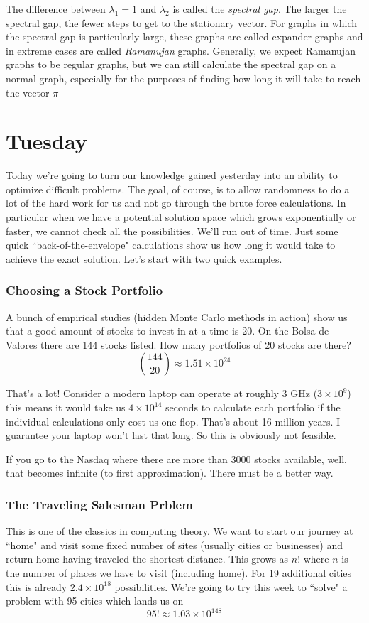 \documentclass{article}
\theoremstyle{definition}
\theoremstyle{remark}
\begin{document}
The difference between $\lambda_1 = 1$ and $\lambda_2$ is called the \emph{spectral gap}. The larger the spectral gap, the fewer steps to get to the stationary vector.  For graphs in which the spectral gap is particularly large, these graphs are called expander graphs and in extreme cases are called \emph{Ramanujan} graphs.  Generally, we expect Ramanujan graphs to be regular graphs, but we can still calculate the spectral gap on a normal graph, especially for the purposes of finding how long it will take to reach the vector $\pi$



\section{Tuesday}

Today we're going to turn our knowledge gained yesterday into an ability to optimize difficult problems.  The goal, of course, is to allow randomness to do a lot of the hard work for us and not go through the brute force calculations.  In particular when we have a potential solution space which grows exponentially or faster, we cannot check all the possibilities.  We'll run out of time.  Just some quick ``back-of-the-envelope" calculations show us how long it would take to achieve the exact solution.  Let's start with two quick examples.
\subsubsection{Choosing a Stock Portfolio}
A bunch of empirical studies (hidden Monte Carlo methods in action) show us that a good amount of stocks to invest in at a time is 20.  On the Bolsa de Valores there are 144 stocks listed.  How many portfolios of 20 stocks are there?
\[
\binom{144}{20} \approx 1.51 \times 10^{24}
\]

That's a lot!  Consider a modern laptop can operate at roughly 3 GHz ($3\times 10^9$) this means it would take us
$4\times 10^{14}$ seconds to calculate each portfolio if the individual calculations only cost us one flop.  That's about 16 million years.  I guarantee your laptop won't last that long.  So this is obviously not feasible.

If you go to the Nasdaq where there are more than 3000 stocks available, well, that becomes infinite (to first approximation).  There must be a better way.

\subsubsection{The Traveling Salesman Prblem}
This is one of the classics in computing theory.  We want to start our journey at ``home" and visit some fixed number of sites (usually cities or businesses) and return home having traveled the shortest distance.  
This grows as $n!$ where $n$ is the number of places we have to visit (including home).  For 19 additional cities this is already $2.4\times10^{18}$ possibilities.  We're going to try this week to ``solve" a problem with 95 cities which lands us on
\[
95! \approx 1.03 \times 10^{148}
\]
\end{document}

